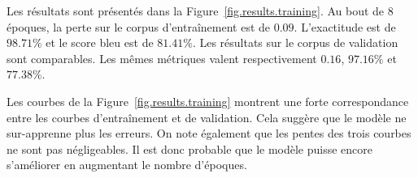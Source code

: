 Les résultats sont présentés dans la Figure~\ref{fig.results.training}.
Au bout de 8 époques, la perte sur le corpus d'entraînement est de \(0.09\).
L'exactitude est de \(98.71\%\) et le score \gls{bleu} est de \(81.41\%\).
Les résultats sur le corpus de validation sont comparables.
Les mêmes métriques valent respectivement \(0.16\), \(97.16\%\) et \(77.38\%\).

Les courbes de la Figure~\ref{fig.results.training} montrent 
une forte correspondance entre les courbes d'entraînement et de validation.
Cela suggère que le modèle ne sur-apprenne plus les erreurs.
On note également que les pentes des trois courbes ne sont pas négligeables.
Il est donc probable que le modèle puisse encore s'améliorer en augmentant le nombre d'époques.